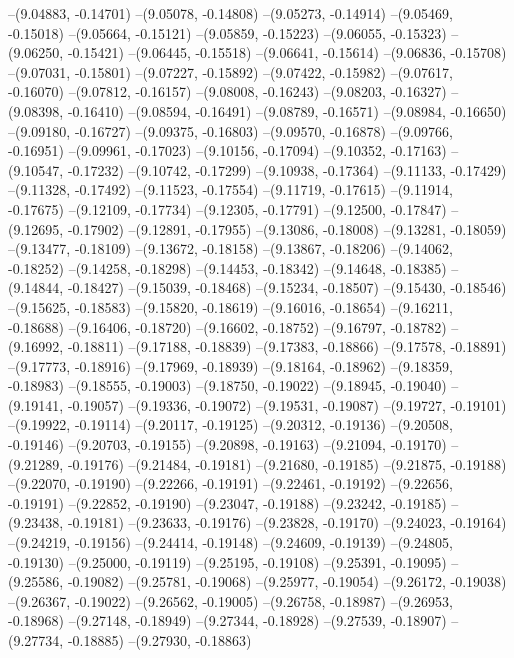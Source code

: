 --(9.04883, -0.14701)
--(9.05078, -0.14808)
--(9.05273, -0.14914)
--(9.05469, -0.15018)
--(9.05664, -0.15121)
--(9.05859, -0.15223)
--(9.06055, -0.15323)
--(9.06250, -0.15421)
--(9.06445, -0.15518)
--(9.06641, -0.15614)
--(9.06836, -0.15708)
--(9.07031, -0.15801)
--(9.07227, -0.15892)
--(9.07422, -0.15982)
--(9.07617, -0.16070)
--(9.07812, -0.16157)
--(9.08008, -0.16243)
--(9.08203, -0.16327)
--(9.08398, -0.16410)
--(9.08594, -0.16491)
--(9.08789, -0.16571)
--(9.08984, -0.16650)
--(9.09180, -0.16727)
--(9.09375, -0.16803)
--(9.09570, -0.16878)
--(9.09766, -0.16951)
--(9.09961, -0.17023)
--(9.10156, -0.17094)
--(9.10352, -0.17163)
--(9.10547, -0.17232)
--(9.10742, -0.17299)
--(9.10938, -0.17364)
--(9.11133, -0.17429)
--(9.11328, -0.17492)
--(9.11523, -0.17554)
--(9.11719, -0.17615)
--(9.11914, -0.17675)
--(9.12109, -0.17734)
--(9.12305, -0.17791)
--(9.12500, -0.17847)
--(9.12695, -0.17902)
--(9.12891, -0.17955)
--(9.13086, -0.18008)
--(9.13281, -0.18059)
--(9.13477, -0.18109)
--(9.13672, -0.18158)
--(9.13867, -0.18206)
--(9.14062, -0.18252)
--(9.14258, -0.18298)
--(9.14453, -0.18342)
--(9.14648, -0.18385)
--(9.14844, -0.18427)
--(9.15039, -0.18468)
--(9.15234, -0.18507)
--(9.15430, -0.18546)
--(9.15625, -0.18583)
--(9.15820, -0.18619)
--(9.16016, -0.18654)
--(9.16211, -0.18688)
--(9.16406, -0.18720)
--(9.16602, -0.18752)
--(9.16797, -0.18782)
--(9.16992, -0.18811)
--(9.17188, -0.18839)
--(9.17383, -0.18866)
--(9.17578, -0.18891)
--(9.17773, -0.18916)
--(9.17969, -0.18939)
--(9.18164, -0.18962)
--(9.18359, -0.18983)
--(9.18555, -0.19003)
--(9.18750, -0.19022)
--(9.18945, -0.19040)
--(9.19141, -0.19057)
--(9.19336, -0.19072)
--(9.19531, -0.19087)
--(9.19727, -0.19101)
--(9.19922, -0.19114)
--(9.20117, -0.19125)
--(9.20312, -0.19136)
--(9.20508, -0.19146)
--(9.20703, -0.19155)
--(9.20898, -0.19163)
--(9.21094, -0.19170)
--(9.21289, -0.19176)
--(9.21484, -0.19181)
--(9.21680, -0.19185)
--(9.21875, -0.19188)
--(9.22070, -0.19190)
--(9.22266, -0.19191)
--(9.22461, -0.19192)
--(9.22656, -0.19191)
--(9.22852, -0.19190)
--(9.23047, -0.19188)
--(9.23242, -0.19185)
--(9.23438, -0.19181)
--(9.23633, -0.19176)
--(9.23828, -0.19170)
--(9.24023, -0.19164)
--(9.24219, -0.19156)
--(9.24414, -0.19148)
--(9.24609, -0.19139)
--(9.24805, -0.19130)
--(9.25000, -0.19119)
--(9.25195, -0.19108)
--(9.25391, -0.19095)
--(9.25586, -0.19082)
--(9.25781, -0.19068)
--(9.25977, -0.19054)
--(9.26172, -0.19038)
--(9.26367, -0.19022)
--(9.26562, -0.19005)
--(9.26758, -0.18987)
--(9.26953, -0.18968)
--(9.27148, -0.18949)
--(9.27344, -0.18928)
--(9.27539, -0.18907)
--(9.27734, -0.18885)
--(9.27930, -0.18863)
